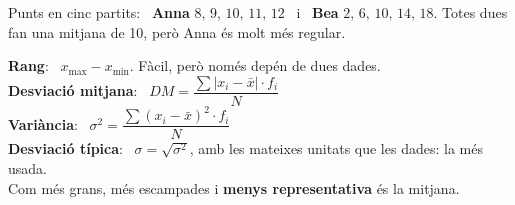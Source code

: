\documentclass[11pt,a4paper]{article}
\newcommand{\heavy}{\fontseries{eb}\selectfont}
\begin{document}
\vfill
\begin{idea}
Punts en cinc partits: \ \textbf{Anna} $8,\,9,\,10,\,11,\,12$ \ i \ \textbf{Bea} $2,\,6,\,10,\,14,\,18$. Totes dues fan una mitjana de 10, però Anna és molt més regular.
\end{idea}

\vfill
\begin{minipage}[c]{0.54\linewidth}\small
\textbf{Rang}: \ $x_{\max}-x_{\min}$. Fàcil, però només depén de dues dades.\\[4pt]
\textbf{Desviació mitjana}: \ $DM=\dfrac{\sum|x_i-\bar x|\cdot f_i}{N}$\\[4pt]
\textbf{Variància}: \ $\sigma^2=\dfrac{\sum(x_i-\bar x)^2\cdot f_i}{N}$\\[4pt]
\textbf{Desviació típica}: \ $\sigma=\sqrt{\sigma^2}$, amb les mateixes unitats que les dades: la més usada.\\[4pt]
Com més grans, més escampades i \textbf{menys representativa} és la mitjana.
\end{minipage}\hfill
\begin{minipage}[c]{0.43\linewidth}\centering
{}
\end{minipage}
\end{document}
